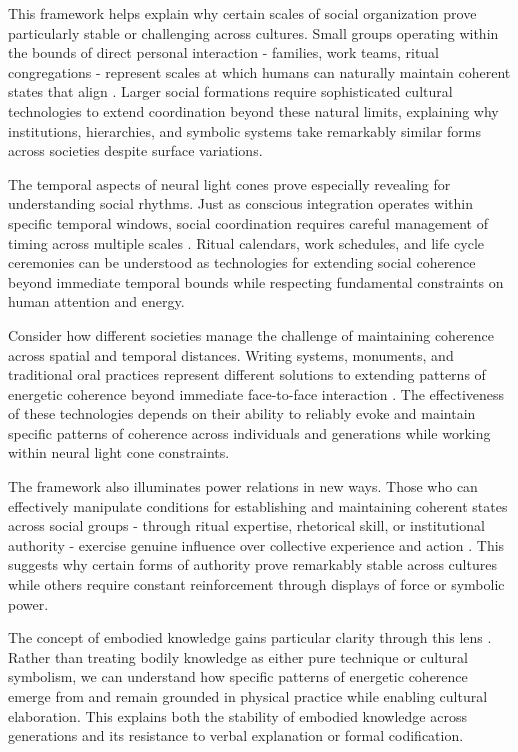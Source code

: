 This framework helps explain why certain scales of social organization prove particularly stable or challenging across cultures. Small groups operating within the bounds of direct personal interaction - families, work teams, ritual congregations - represent scales at which humans can naturally maintain coherent states that align \cite{hutchins1995cognition}. Larger social formations require sophisticated cultural technologies to extend coordination beyond these natural limits, explaining why institutions, hierarchies, and symbolic systems take remarkably similar forms across societies despite surface variations.

The temporal aspects of neural light cones prove especially revealing for understanding social rhythms. Just as conscious integration operates within specific temporal windows, social coordination requires careful management of timing across multiple scales \cite{mcneill1995keeping}. Ritual calendars, work schedules, and life cycle ceremonies can be understood as technologies for extending social coherence beyond immediate temporal bounds while respecting fundamental constraints on human attention and energy.

Consider how different societies manage the challenge of maintaining coherence across spatial and temporal distances. Writing systems, monuments, and traditional oral practices represent different solutions to extending patterns of energetic coherence beyond immediate face-to-face interaction \cite{thompson2001radical}. The effectiveness of these technologies depends on their ability to reliably evoke and maintain specific patterns of coherence across individuals and generations while working within neural light cone constraints.

The framework also illuminates power relations in new ways. Those who can effectively manipulate conditions for establishing and maintaining coherent states across social groups - through ritual expertise, rhetorical skill, or institutional authority - exercise genuine influence over collective experience and action \cite{bourdieu1977outline}. This suggests why certain forms of authority prove remarkably stable across cultures while others require constant reinforcement through displays of force or symbolic power.

The concept of embodied knowledge gains particular clarity through this lens \cite{csordas1994embodiment}. Rather than treating bodily knowledge as either pure technique or cultural symbolism, we can understand how specific patterns of energetic coherence emerge from and remain grounded in physical practice while enabling cultural elaboration. This explains both the stability of embodied knowledge across generations and its resistance to verbal explanation or formal codification.

